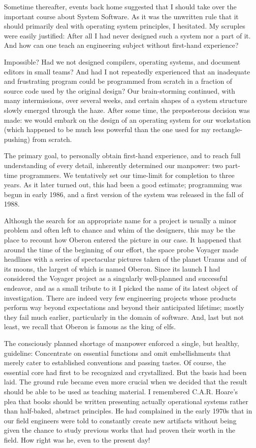 Sometime thereafter, events back home suggested that I should take
over the important course about System Software. As it was the
unwritten rule that it should primarily deal with operating system
principles, I hesitated. My scruples were easily justified: After all
I had never designed such a system nor a part of it. And how can one
teach an engineering subject without first-hand experience?

Impossible? Had we not designed compilers, operating systems, and
document editors in small teams? And had I not repeatedly experienced
that an inadequate and frustrating program could be programmed from
scratch in a fraction of source code used by the original design? Our
brain-storming continued, with many intermissions, over several
weeks, and certain shapes of a system structure slowly emerged through
the haze. After some time, the preposterous decision was made: we
would embark on the design of an operating system for our workstation
(which happened to be much less powerful than the one used for my
rectangle-pushing) from scratch.

The primary goal, to personally obtain first-hand experience, and to
reach full understanding of every detail, inherently determined our
manpower: two part-time programmers. We tentatively set our time-limit
for completion to three years. As it later turned out, this had been a
good estimate; programming was begun in early 1986, and a first
version of the system was released in the fall of 1988.

Although the search for an appropriate name for a project is usually a
minor problem and often left to chance and whim of the designers, this
may be the place to recount how Oberon entered the picture in our
case. It happened that around the time of the beginning of our effort,
the space probe Voyager made headlines with a series of spectacular
pictures taken of the planet Uranus and of its moons, the largest of
which is named Oberon. Since its launch I had considered the Voyager
project as a singularly well-planned and successful endeavor, and as a
small tribute to it I picked the name of its latest object of
investigation. There are indeed very few engineering projects whose
products perform way beyond expectations and beyond their anticipated
lifetime; mostly they fail much earlier, particularly in the domain of
software. And, last but not least, we recall that Oberon is famous as
the king of elfs.

The consciously planned shortage of manpower enforced a single, but
healthy, guideline: Concentrate on essential functions and omit
embellishments that merely cater to established conventions and
passing tastes. Of course, the essential core had first to be
recognized and crystallized. But the basis had been laid. The ground
rule became even more crucial when we decided that the result should
be able to be used as teaching material. I remembered C.A.R. Hoare's
plea that books should be written presenting actually operational
systems rather than half-baked, abstract principles. He had
complained in the early 1970s that in our field engineers were told to
constantly create new artifacts without being given the chance to
study previous works that had proven their worth in the field. How
right was he, even to the present day!

